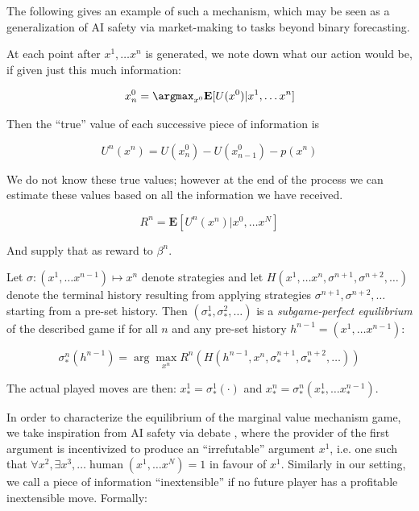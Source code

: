 The following gives an example of such a mechanism, which may be seen as a generalization of AI safety via market-making to tasks beyond binary forecasting.

\begin{definition}
At each point after $x^1,\dots x^n$ is generated, we note down what our action would be, if given just this much information:

$$x^0_n=\argmax_{x^0}\mathbf{E}[U(x^0)|x^1,\dots x^n]$$

Then the ``true'' value of each successive piece of information is

$$U^n(x^n)=U(x^0_n)-U(x^0_{n-1}) - p(x^n)$$

We do not know these true values; however at the end of the process we can estimate these values based on all the information we have received.

$$R^n=\mathbf{E}[U^n(x^n)|x^0,\dots x^N]$$

And supply that as reward to $\beta^n$.
\label{def:mvm}
\end{definition}



\begin{definition}[Equilibrium]
Let $\sigma:(x^1,\dots x^{n-1})\mapsto x^n$ denote strategies and let $H(x^1,\dots x^n,\sigma^{n+1},\sigma^{n+2},\dots)$ denote the terminal history resulting from applying strategies $\sigma^{n+1},\sigma^{n+2},\dots$ starting from a pre-set history. Then $(\sigma^1_*,\sigma^2_*,\dots)$ is a \emph{subgame-perfect equilibrium} of the described game if for all $n$ and any pre-set history $h^{n-1}=(x^1,\dots x^{n-1})$:

$$\sigma^n_*(h^{n-1}) = \arg\max_{x^n}R^n(H(h^{n-1},x^n,\sigma^{n+1}_*,\sigma^{n+2}_*,\dots))$$

The actual played moves are then: $x^1_*=\sigma^1_*(\cdot)$ and $x^n_*=\sigma^n_*(x^1_*,\dots x^{n-1}_*)$.
\label{def:eq}
\end{definition}

In order to characterize the equilibrium of the marginal value mechanism game, we take inspiration from AI safety via debate , where the provider of the first argument is incentivized to produce an ``irrefutable'' argument $x^1$, i.e. one such that $\forall x^2,\exists x^3, \dots\operatorname{human}(x^1,\dots x^N)=1$ in favour of $x^1$. Similarly in our setting, we call a piece of information ``inextensible'' if no future player has a profitable inextensible move. Formally:

